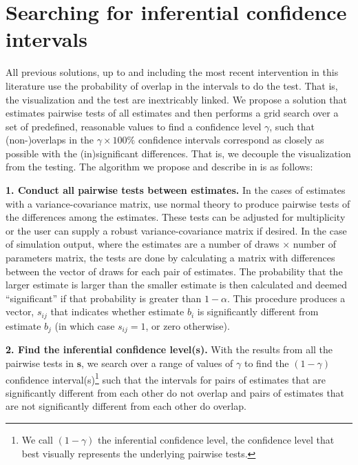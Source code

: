 \section{Searching for inferential confidence intervals}\label{searching-for-inferential-confidence-intervals}

All previous solutions, up to and including the most recent intervention in this literature \citep{radean2023} use the probability of overlap in the intervals to do the test. That is, the visualization and the test are inextricably linked. We propose a solution that estimates pairwise tests of all estimates and then performs a grid search over a set of predefined, reasonable values to find a confidence level \(\gamma\), such that (non-)overlaps in the \(\gamma\times 100\%\) confidence intervals correspond as closely as possible with the (in)significant differences. That is, we decouple the visualization from the testing. The algorithm we propose and describe in \citet{armstrong_2025} is as follows:

\textbf{1. Conduct all pairwise tests between estimates.} In the cases of estimates with a variance-covariance matrix, use normal theory to produce pairwise tests of the differences among the estimates. These tests can be adjusted for multiplicity or the user can supply a robust variance-covariance matrix if desired. In the case of simulation output, where the estimates are a number of draws \(\times\) number of parameters matrix, the tests are done by calculating a matrix with differences between the vector of draws for each pair of estimates. The probability that the larger estimate is larger than the smaller estimate is then calculated and deemed ``significant'' if that probability is greater than \(1-\alpha\). This procedure produces a vector, \(s_{ij}\) that indicates whether estimate \(b_i\) is significantly different from estimate \(b_j\) (in which case \(s_{ij} = 1\), or zero otherwise).

\textbf{2. Find the inferential confidence level(s).} With the results from all the pairwise tests in \(\boldsymbol s\), we search over a range of values of \(\gamma\) to find the \((1-\gamma)\) confidence interval(s)\footnote{We call \((1-\gamma)\) the inferential confidence level, the confidence level that best visually represents the underlying pairwise tests.} such that the intervals for pairs of estimates that are significantly different from each other do not overlap and pairs of estimates that are not significantly different from each other do overlap.

